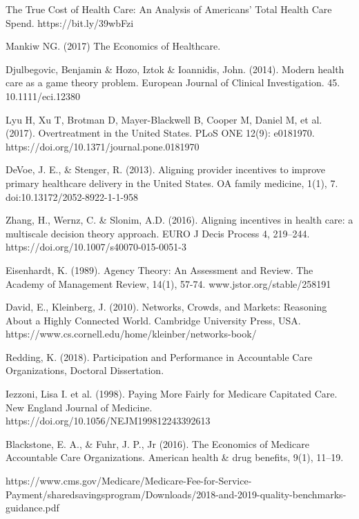 \documentclass{article}
\begin{document}

\clearpage

\begin{thebibliography}{8}

The True Cost of Health Care: An Analysis of Americans’ Total Health Care Spend. https://bit.ly/39wbFzi

Mankiw NG. (2017) The Economics of Healthcare.

Djulbegovic, Benjamin \& Hozo, Iztok \& Ioannidis, John. (2014). Modern health care as a game theory problem. European Journal of Clinical Investigation. 45. 10.1111/eci.12380

Lyu H, Xu T, Brotman D, Mayer-Blackwell B, Cooper M, Daniel M, et al. (2017). Overtreatment in the United States. PLoS ONE 12(9): e0181970. https://doi.org/10.1371/journal.pone.0181970

DeVoe, J. E., \& Stenger, R. (2013). Aligning provider incentives to improve primary healthcare delivery in the United States. OA family medicine, 1(1), 7. doi:10.13172/2052-8922-1-1-958

Zhang, H., Wernz, C. \& Slonim, A.D. (2016). Aligning incentives in health care: a multiscale decision theory approach. EURO J Decis Process 4, 219–244. https://doi.org/10.1007/s40070-015-0051-3

Eisenhardt, K. (1989). Agency Theory: An Assessment and Review. The Academy of Management Review, 14(1), 57-74. www.jstor.org/stable/258191

David, E., Kleinberg, J. (2010). Networks, Crowds, and Markets: Reasoning About a Highly Connected World. Cambridge University Press, USA. https://www.cs.cornell.edu/home/kleinber/networks-book/

Redding, K. (2018). Participation and Performance in Accountable Care Organizations, Doctoral Dissertation.

Iezzoni, Lisa I. et al. (1998). Paying More Fairly for Medicare Capitated Care. New England Journal of Medicine. https://doi.org/10.1056/NEJM199812243392613

Blackstone, E. A., \& Fuhr, J. P., Jr (2016). The Economics of Medicare Accountable Care Organizations. American health \& drug benefits, 9(1), 11–19.

https://www.cms.gov/Medicare/Medicare-Fee-for-Service-Payment/sharedsavingsprogram/Downloads\-/2018-and-2019-quality-benchmarks-guidance.pdf


\end{thebibliography}
\end{document}
